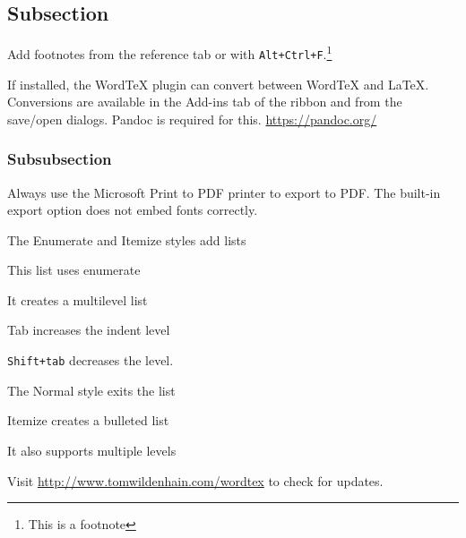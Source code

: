 \documentclass[11pt]{article}
\begin{document}
\subsection{Subsection}\label{subsection}

Add footnotes from the reference tab or with
\texttt{Alt+Ctrl+F}.\footnote{This is a footnote}

If installed, the WordTeX plugin can convert between WordTeX and LaTeX.
Conversions are available in the Add-ins tab of the ribbon and from the
save/open dialogs. Pandoc is required for this.
\url{https://pandoc.org/}

\subsubsection{Subsubsection}\label{subsubsection}

Always use the Microsoft Print to PDF printer to export to PDF. The
built-in export option does not embed fonts correctly.

The Enumerate and Itemize styles add lists

This list uses enumerate

It creates a multilevel list

Tab increases the indent level

\texttt{Shift+tab} decreases the level.

The Normal style exits the list

Itemize creates a bulleted list

It also supports multiple levels

Visit \url{http://www.tomwildenhain.com/wordtex} to check for updates.

    
\end{document}
